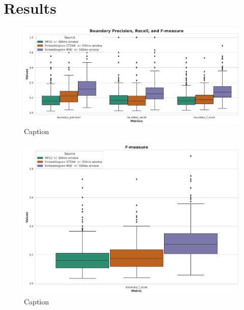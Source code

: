 \chapter{Results}



\begin{figure}
    \centering
    \includegraphics[width=\textwidth]{figures/images/first results.png}
    \caption{Caption}
    \label{fig:boxplotmetrics}
\end{figure}

\begin{figure}
    \centering
    \includegraphics[width=\textwidth]{figures/images/f-measure.png}
    \caption{Caption}
    \label{fig:boxplotfmeasure}
\end{figure}

\newpage


